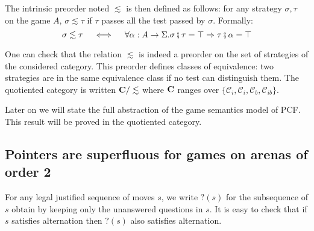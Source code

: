 The intrinsic preorder noted $\lesssim$ is then defined as follows:
for any strategy $\sigma,\tau$ on the game $A$, $\sigma \lesssim \tau$ if $\tau$ passes all the test passed by $\sigma$. Formally:
$$ \sigma \lesssim \tau \quad \iff \quad \forall \alpha : A \rightarrow \Sigma. \sigma \fatsemi \tau = \top \Rightarrow \tau \fatsemi \alpha = \top$$

One can check that the relation $\lesssim$ is indeed a preorder on the set of strategies of the considered category.
This preorder defines classes of equivalence: two strategies are in the same equivalence class if no test can distinguish them.
The quotiented category is written $\bf C/\lesssim$ where $\bf C$ ranges over $\{ \mathcal{C}_i, \mathcal{C}_i, \mathcal{C}_b, \mathcal{C}_{ib} \}$.

Later on we will state the full abstraction of the game semantics model of PCF. This result will
be proved in the quotiented category.

\subsection{Pointers are superfluous for games on arenas of order 2}

For any legal justified sequence of moves $s$, we write $?(s)$ for the
subsequence of $s$ obtain by keeping only the unanswered questions in $s$. It is easy to check that if $s$ satisfies alternation then $?(s)$ also
satisfies alternation.

